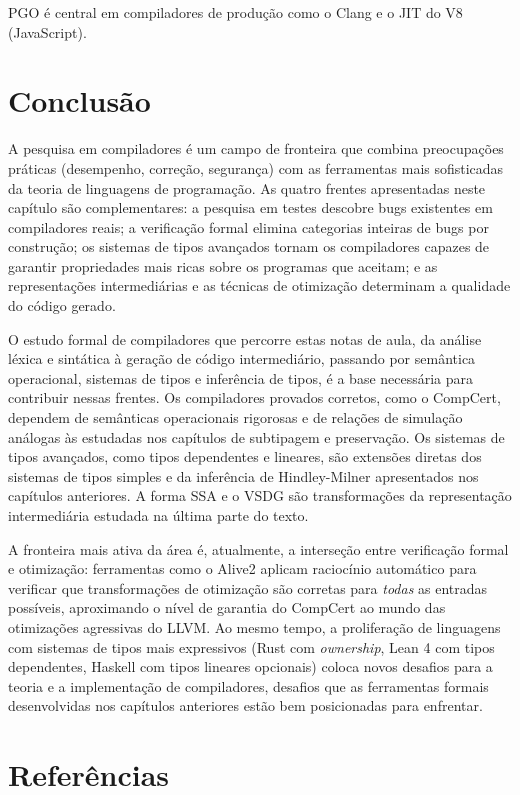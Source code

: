 PGO é central em compiladores de produção como o Clang e o JIT do V8
(JavaScript).

\section{Conclusão}

A pesquisa em compiladores é um campo de fronteira que combina
preocupações práticas (desempenho, correção, segurança) com as
ferramentas mais sofisticadas da teoria de linguagens de programação.
As quatro frentes apresentadas neste capítulo são complementares: a
pesquisa em testes descobre bugs existentes em compiladores reais; a
verificação formal elimina categorias inteiras de bugs por construção;
os sistemas de tipos avançados tornam os compiladores capazes de
garantir propriedades mais ricas sobre os programas que aceitam; e as
representações intermediárias e as técnicas de otimização determinam
a qualidade do código gerado.

O estudo formal de compiladores que percorre estas notas de aula, da
análise léxica e sintática à geração de código intermediário, passando
por semântica operacional, sistemas de tipos e inferência de tipos,
é a base necessária para contribuir nessas frentes. Os compiladores
provados corretos, como o CompCert, dependem de semânticas
operacionais rigorosas e de relações de simulação análogas às
estudadas nos capítulos de subtipagem e preservação. Os sistemas de
tipos avançados, como tipos dependentes e lineares, são extensões
diretas dos sistemas de tipos simples e da inferência de Hindley-Milner
apresentados nos capítulos anteriores. A forma SSA e o VSDG são
transformações da representação intermediária estudada na última parte
do texto.

A fronteira mais ativa da área é, atualmente, a interseção entre
verificação formal e otimização: ferramentas como o Alive2 aplicam
raciocínio automático para verificar que transformações de otimização
são corretas para \emph{todas} as entradas possíveis, aproximando o
nível de garantia do CompCert ao mundo das otimizações agressivas do
LLVM. Ao mesmo tempo, a proliferação de linguagens com sistemas de
tipos mais expressivos (Rust com \emph{ownership}, Lean 4 com tipos
dependentes, Haskell com tipos lineares opcionais) coloca novos
desafios para a teoria e a implementação de compiladores, desafios que
as ferramentas formais desenvolvidas nos capítulos anteriores estão
bem posicionadas para enfrentar.

\section{Referências}

